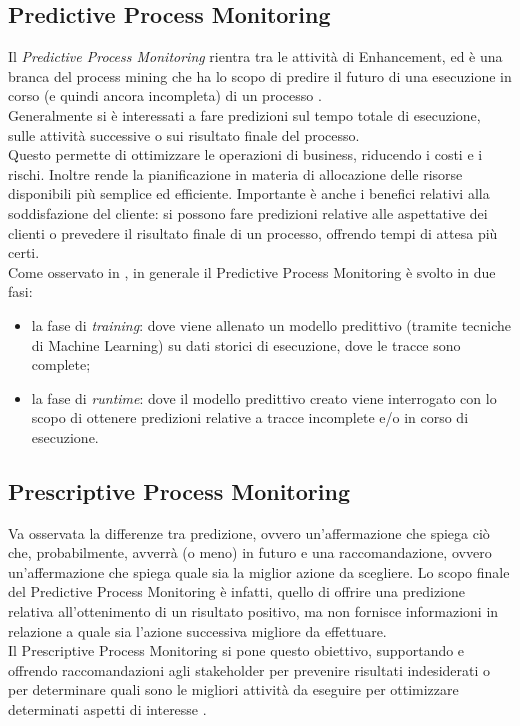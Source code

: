 \subsection{Predictive Process Monitoring}
Il \textit{Predictive Process Monitoring} rientra tra le attività di Enhancement, ed è una branca del process mining che ha lo scopo di predire il futuro di una esecuzione in corso (e quindi ancora incompleta) di un processo \cite{pm-handbook}.
\\
Generalmente si è interessati a fare predizioni sul tempo totale di esecuzione, sulle attività successive o sui risultato finale del processo.
\\
Questo permette di ottimizzare le operazioni di business, riducendo i costi e i rischi. Inoltre rende la pianificazione in materia di allocazione delle risorse disponibili più semplice ed efficiente.
Importante è anche i benefici relativi alla soddisfazione del cliente: si possono fare predizioni relative alle aspettative dei clienti o prevedere il risultato finale di un processo, offrendo tempi di attesa più certi. 
\\
Come osservato in \cite{pm-handbook}, in generale il Predictive Process Monitoring è svolto in due fasi:
\begin{itemize}
\item la fase di \textit{training}: dove viene allenato un modello predittivo (tramite tecniche di Machine Learning) su dati storici di esecuzione, dove le tracce sono complete;
\item la fase di \textit{runtime}: dove il modello predittivo creato viene interrogato con lo scopo di ottenere predizioni relative a tracce incomplete e/o in corso di esecuzione.
\end{itemize}

\subsection{Prescriptive Process Monitoring}
Va osservata la differenze tra predizione, ovvero un'affermazione che spiega ciò che, probabilmente, avverrà (o meno) in futuro e una raccomandazione, ovvero un'affermazione che spiega quale sia la miglior azione da scegliere.
Lo scopo finale del Predictive Process Monitoring è infatti, quello di offrire una predizione relativa all'ottenimento di un risultato positivo, ma non fornisce informazioni in relazione a quale sia l'azione successiva migliore da effettuare.
\\
Il Prescriptive Process Monitoring si pone questo obiettivo, supportando e offrendo raccomandazioni agli stakeholder per prevenire risultati indesiderati o per determinare quali sono le migliori attività da eseguire per ottimizzare determinati aspetti di interesse \cite{pm-handbook}.


